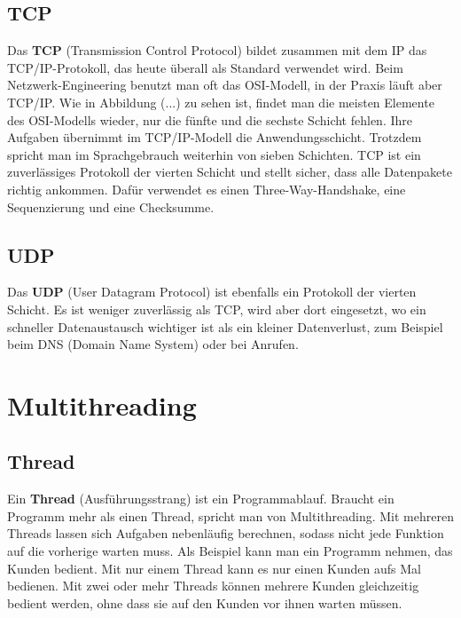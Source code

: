 \subsection{TCP}

Das \textbf{TCP} (Transmission Control Protocol) bildet zusammen mit dem IP das TCP/IP-Protokoll, das heute überall als Standard verwendet wird.\citep{TransmissionControlProtocol2025,TCPIP} Beim Netzwerk-Engineering benutzt man oft das OSI-Modell, in der Praxis läuft aber TCP/IP.\citep{networkchuckWhatTCPIP2020} Wie in Abbildung (...) zu sehen ist, findet man die meisten Elemente des OSI-Modells wieder, nur die fünfte und die sechste Schicht fehlen. Ihre Aufgaben übernimmt im TCP/IP-Modell die Anwendungsschicht. Trotzdem spricht man im Sprachgebrauch weiterhin von sieben Schichten. TCP ist ein zuverlässiges Protokoll der vierten Schicht und stellt sicher, dass alle Datenpakete richtig ankommen. Dafür verwendet es einen Three-Way-Handshake, eine Sequenzierung und eine Checksumme.

\subsection{UDP}

Das \textbf{UDP} (User Datagram Protocol) ist ebenfalls ein Protokoll der vierten Schicht. Es ist weniger zuverlässig als TCP, wird aber dort eingesetzt, wo ein schneller Datenaustausch wichtiger ist als ein kleiner Datenverlust, zum Beispiel beim DNS (Domain Name System) oder bei Anrufen.

\section{Multithreading}

\subsection{Thread}

Ein \textbf{Thread} (Ausführungsstrang) ist ein Programmablauf. Braucht ein Programm mehr als einen Thread, spricht man von Multithreading.\citep{ThreadingThreadbasedParallelism} Mit mehreren Threads lassen sich Aufgaben nebenläufig berechnen, sodass nicht jede Funktion auf die vorherige warten muss. Als Beispiel kann man ein Programm nehmen, das Kunden bedient. Mit nur einem Thread kann es nur einen Kunden aufs Mal bedienen. Mit zwei oder mehr Threads können mehrere Kunden gleichzeitig bedient werden, ohne dass sie auf den Kunden vor ihnen warten müssen.

